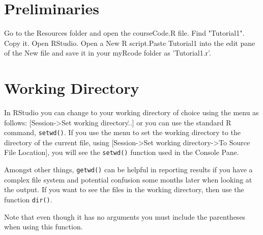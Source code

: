 \documentclass[titlepage]{book}\usepackage{knitr}
\begin{document}
\author{Brian Williams $<$\href{mailto:bjw649@gmail.com}%
{bjw649@gmail.com}$>$}

\section{Preliminaries}

Go to the Resources folder and open the courseCode.R file.  Find "Tutorial1". Copy it.  Open RStudio. Open a New R script.Paste Tutorial1 into the edit pane of the New file and save it in your myRcode folder as 'Tutorial1.r'.

\section{Working Directory}

In RStudio you can change to your working directory of choice using the menu as follows: [Session->Set working directory\...] or you can use the standard R command, \texttt{setwd()}.  If you use the menu to set the working directory to the directory of the current file, using [Session->Set working directory->To Source File Location], you will see the  \texttt{setwd()} function used in the Console Pane.


\begin{knitrout}
\color{fgcolor}\begin{kframe}
\begin{alltt}
\hlstd{()}
\end{alltt}
\end{kframe}
\end{knitrout}
Amongst other things, \texttt{getwd()} can be helpful in reporting results if you have a complex file system and potential confusion some months later when looking at the output.
If you want to see the files in the working directory, then use the function \texttt{dir()}.

\begin{knitrout}
\color{fgcolor}\begin{kframe}
\begin{alltt}
\hlstd{()}
\end{alltt}
\end{kframe}
\end{knitrout}

Note that even though it has no arguments you must include the parentheses when using this function.
\end{document}
